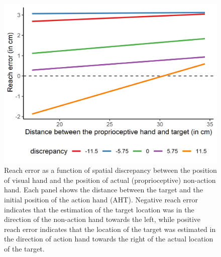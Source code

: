 \begin{figure}[t]
\centering       
    \includegraphics[scale=0.8]{Images/exp2_results.png}
    \caption{Reach error as a function of spatial discrepancy between the position of visual hand and the position of actual (proprioceptive) non-action hand. Each panel shows the distance between the target and the initial position of the action hand (AHT). Negative reach error indicates that the estimation of the target location was in the direction of the non-action hand towards the left, while positive reach error indicates that the location of the target was estimated in the direction of action hand towards the right of the actual location of the target.}
    \label{fig:exp2_re-pht}
\end{figure}